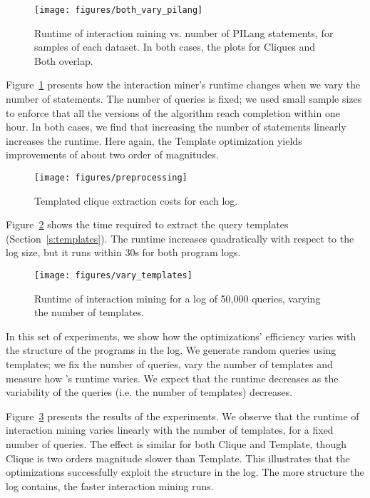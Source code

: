 \begin{figure}[h!]
    \centering
    \texttt{[image: figures/both\_vary\_pilang]}
    \caption{Runtime of interaction mining vs. number of PILang statements, for samples of each dataset. In both cases, the plots for Cliques and Both overlap.}
    \label{fig:pl-sdss}
\end{figure}
 Figure~\ref{fig:pl-sdss} presents how the interaction miner's runtime changes when we vary the number of \lang statements. The number of queries is fixed; we used small sample sizes to enforce that all the versions of the algorithm reach completion within one hour. In both cases, we find that increasing the number of statements linearly increases the runtime. Here again, the Template optimization yields improvements of about two order of magnitudes.

\begin{figure}[h!]
    \centering
    \texttt{[image: figures/preprocessing]}
    \caption{Templated clique extraction costs for each log.}
    \label{fig:prepro}
\end{figure}
 Figure~\ref{fig:prepro} shows the time required to extract the query templates (Section~\ref{s:templates}). The runtime increases quadratically with respect to the log size, but it runs within $30$s for both program logs. %



\begin{figure}[h!]
    \centering
    \texttt{[image: figures/vary\_templates]}
    \caption{Runtime of interaction mining for a log of 50,000 queries, varying the number of templates.}
    \label{fig:ui-template}
\end{figure}
In this set of experiments, we show how the optimizations' efficiency varies with the structure of the programs in the log. We generate random queries using templates; we fix the number of queries, vary the number of templates and measure how \sys{}'s runtime varies. We expect that the runtime decreases as the variability of the queries (i.e. the number of templates) decreases.

Figure~\ref{fig:ui-template} presents the results of the experiments. We observe that the runtime of interaction mining varies linearly with the number of templates, for a fixed number of queries. The effect is similar for both Clique and Template, though Clique is two orders magnitude slower than Template. This illustrates that the optimizations successfully exploit the structure in the log. The more structure the log contains, the faster interaction mining runs.






